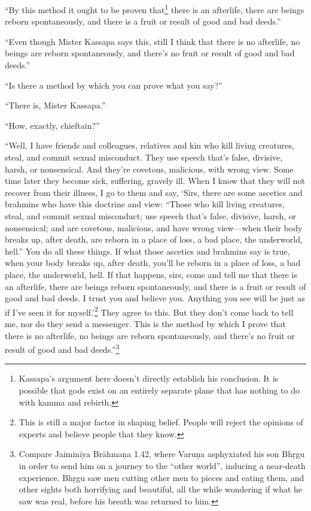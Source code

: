 \documentclass[12pt,openany]{book}%
\begin{document}
“By this method it ought to be proven that\footnote{Kassapa’s argument here doesn’t directly establish his conclusion. It is possible that gods exist on an entirely separate plane that has nothing to do with kamma and rebirth. } there is an afterlife, there are beings reborn spontaneously, and there is a fruit or result of good and bad deeds.” 

“Even though Mister Kassapa says this, still I think that there is no afterlife, no beings are reborn spontaneously, and there’s no fruit or result of good and bad deeds.” 

“Is there a method by which you can prove what you say?” 

“There is, Mister Kassapa.” 

“How, exactly, chieftain?” 

“Well, I have friends and colleagues, relatives and kin who kill living creatures, steal, and commit sexual misconduct. They use speech that’s false, divisive, harsh, or nonsensical. And they’re covetous, malicious, with wrong view. Some time later they become sick, suffering, gravely ill. When I know that they will not recover from their illness, I go to them and say, ‘Sirs, there are some ascetics and brahmins who have this doctrine and view: “Those who kill living creatures, steal, and commit sexual misconduct; use speech that’s false, divisive, harsh, or nonsensical; and are covetous, malicious, and have wrong view—when their body breaks up, after death, are reborn in a place of loss, a bad place, the underworld, hell.” You do all these things. If what those ascetics and brahmins say is true, when your body breaks up, after death, you’ll be reborn in a place of loss, a bad place, the underworld, hell. If that happens, sirs, come and tell me that there is an afterlife, there are beings reborn spontaneously, and there is a fruit or result of good and bad deeds. I trust you and believe you. Anything you see will be just as if I’ve seen it for myself.’\footnote{This is still a major factor in shaping belief. People will reject the opinions of experts and believe people that they know. } They agree to this. But they don’t come back to tell me, nor do they send a messenger. This is the method by which I prove that there is no afterlife, no beings are reborn spontaneously, and there’s no fruit or result of good and bad deeds.”\footnote{Compare \textsanskrit{Jaiminīya} \textsanskrit{Brāhmaņa} 1.42, where \textsanskrit{Varuṇa} asphyxiated his son \textsanskrit{Bhṛgu} in order to send him on a journey to the “other world”, inducing a near-death experience. \textsanskrit{Bhṛgu} saw men cutting other men to pieces and eating them, and other sights both horrifying and beautiful, all the while wondering if what he saw was real, before his breath was returned to him. } 
\end{document}
